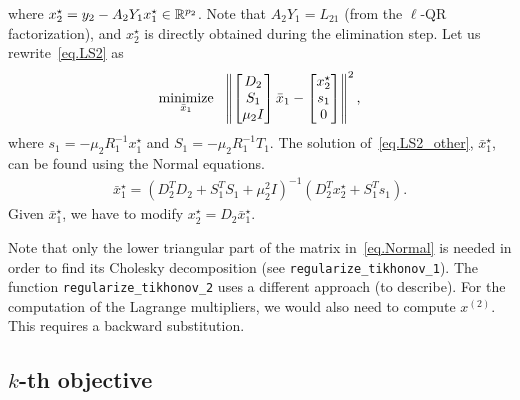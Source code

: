 \documentclass[12pt]{article}
\begin{document}
%
where $x_2^{\star} = y_2 - A_2Y_1x_1^{\star} \in {\mathbb{R}}^{p_2}$. Note that $A_2Y_1 = L_{21}$ (from the $\ell$-QR
factorization), and $x_2^{\star}$ is directly obtained during the elimination step. Let us
rewrite~\eqref{eq.LS2} as
%
\begin{align} \label{eq.LS2_other}
  \mathop{\mbox{minimize}}_{\bar{x}_1} \ \  \left\lVert\begin{bmatrix} D_2 \\ S_1 \\ \mu_2I \end{bmatrix}\bar{x}_1 -
    \begin{bmatrix} x_2^{\star} \\ s_1 \\ 0 \end{bmatrix}\right\rVert^2,
\end{align}
%
where $s_1 = -\mu_2R_1^{-1}x_1^{\star}$ and $S_1 = -\mu_2R_1^{-1}T_1$. The solution
of~\eqref{eq.LS2_other}, $\bar{x}_1^{\star}$, can be found using the Normal equations.
%
\begin{align} \label{eq.Normal}
  \bar{x}_1^{\star} = (D_2^TD_2 + S_1^TS_1 + \mu_2^2I)^{-1} (D_2^Tx_2^{\star} + S_1^Ts_1).
\end{align}
%
Given $\bar{x}_1^{\star}$, we have to modify $x_2^{\star} = D_2\bar{x}_1^{\star}$.

Note that only the lower triangular part of the matrix in~\eqref{eq.Normal} is needed in order to
find its Cholesky decomposition (see {\color{blue}\verb|regularize_tikhonov_1|}). The function
{\color{blue}\verb|regularize_tikhonov_2|} uses a different approach ({\color{red}to describe}). For
the computation of the Lagrange multipliers, we would also need to compute $x^{(2)}$. This requires
a backward substitution.

\newpage

\subsection{$k$-th objective}
\end{document}
